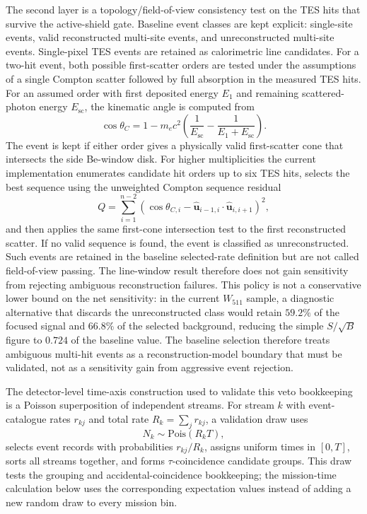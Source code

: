 \documentclass[preprint,12pt]{elsarticle}
\newcommand{\wii}{W_{511}}
\begin{document}
The second layer is a topology/field-of-view consistency test on the TES hits
that survive the active-shield gate. Baseline event classes are kept explicit:
single-site events, valid reconstructed multi-site events, and unreconstructed
multi-site events. Single-pixel TES events are retained as calorimetric line
candidates. For a two-hit event, both possible first-scatter orders are tested
under the assumptions of a single Compton scatter followed by full absorption
in the measured TES hits. For an assumed order with first deposited energy
$E_1$ and remaining scattered-photon energy $E_{\mathrm{sc}}$, the kinematic
angle is computed from
\begin{equation}
  \cos\theta_C =
  1 - m_ec^2\left(\frac{1}{E_{\mathrm{sc}}}
  - \frac{1}{E_1+E_{\mathrm{sc}}}\right).
\end{equation}
The event is kept if either order gives a physically valid first-scatter cone
that intersects the side Be-window disk. For higher multiplicities the current
implementation enumerates candidate hit orders up to six TES hits, selects the
best sequence using the unweighted Compton sequence residual
\begin{equation}
  Q = \sum_{i=1}^{n-2}
  \left(\cos\theta_{C,i} -
  \hat{\mathbf u}_{i-1,i}\cdot\hat{\mathbf u}_{i,i+1}\right)^2,
\end{equation}
and then applies the same first-cone intersection test to the first reconstructed
scatter. If no valid sequence is found, the event is classified as
unreconstructed. Such events are retained in the baseline selected-rate
definition but are not called field-of-view passing. The line-window result
therefore does not gain sensitivity from rejecting ambiguous reconstruction
failures. This policy is not a conservative lower bound on the net sensitivity:
in the current $\wii$ sample, a diagnostic alternative that discards the
unreconstructed class would retain $59.2\%$ of the focused signal and $66.8\%$
of the selected background, reducing the simple $S/\sqrt{B}$ figure to $0.724$
of the baseline value. The baseline selection therefore treats ambiguous
multi-hit events as a reconstruction-model boundary that must be validated, not
as a sensitivity gain from aggressive event rejection.

The detector-level time-axis construction used to validate this veto bookkeeping
is a Poisson superposition of independent streams. For stream $k$ with
event-catalogue rates $r_{kj}$ and total rate $R_k=\sum_j r_{kj}$, a validation
draw uses
\begin{equation}
  N_k\sim \mathrm{Pois}(R_k T),
\end{equation}
selects event records with probabilities $r_{kj}/R_k$, assigns uniform times in
$[0,T]$, sorts all streams together, and forms $\tau$-coincidence candidate
groups. This draw tests the grouping and accidental-coincidence bookkeeping;
the mission-time calculation below uses the corresponding expectation values
instead of adding a new random draw to every mission bin.
\end{document}
